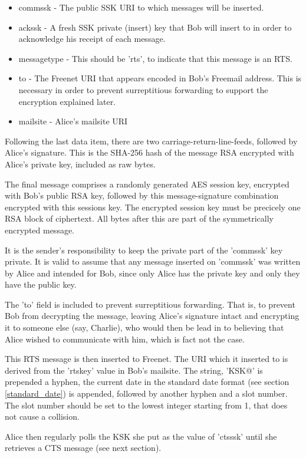 \documentclass[12pt,a4paper]{article}
\begin{document}
\begin{itemize}
\item commssk - The public SSK URI to which messages will be inserted.
\item ackssk - A fresh SSK private (insert) key that Bob will insert to in order to acknowledge his receipt of each message.
\item messagetype - This should be 'rts', to indicate that this message is an RTS.
\item to - The Freenet URI that appears encoded in Bob's Freemail address. This is necessary in order to prevent surreptitious forwarding to support the encryption explained later.
\item mailsite - Alice's mailsite URI
\end{itemize}

Following the last data item, there are two carriage-return-line-feeds, followed by Alice's signature. This is the SHA-256 hash of the message RSA encrypted with Alice's private key, included as raw bytes.

The final message comprises a randomly generated AES session key, encrypted with Bob's public RSA key, followed by this message-signature combination encrypted with this sessions key. The encrypted session key must be precicely one RSA block of ciphertext. All bytes after this are part of the symmetrically encrypted message.

It is the sender's responsibility to keep the private part of the 'commssk' key private. It is valid to assume that any message inserted on 'commssk' was written by Alice and intended for Bob, since only Alice has the private key and only they have the public key.

The 'to' field is included to prevent surreptitious forwarding. That is, to prevent Bob from decrypting the message, leaving Alice's signature intact and encrypting it to someone else (say, Charlie), who would then be lead in to believing that Alice wished to communicate with him, which is fact not the case.

This RTS message is then inserted to Freenet. The URI which it inserted to is derived from the 'rtskey' value in Bob's mailsite. The string, 'KSK@' is prepended a hyphen, the current date in the standard date format (see section \ref{standard_date}) is appended, followed by another hyphen and a slot number. The slot number should be set to the lowest integer starting from 1, that does not cause a collision.

Alice then regularly polls the KSK she put as the value of 'ctsssk' until she retrieves a CTS message (see next section).
\end{document}
